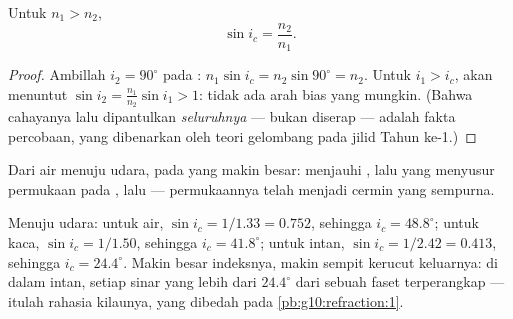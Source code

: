 \begin{proposition}\label{prop:g10:refraction:criticalformula}
Untuk $n_1 > n_2$,
\[
\sin i_c = \frac{n_2}{n_1} .
\]
\end{proposition}

\begin{proof}
Ambillah $i_2 = 90^\circ$ pada : $n_1 \sin i_c = n_2 \sin 90^\circ
= n_2$. Untuk $i_1 > i_c$,  akan menuntut
$\sin i_2 = \frac{n_1}{n_2}\sin i_1 > 1$: tidak ada arah bias yang
mungkin. (Bahwa cahayanya lalu dipantulkan \emph{seluruhnya} --- bukan
diserap --- adalah fakta percobaan, yang dibenarkan oleh teori gelombang
pada jilid Tahun ke-1.)
\end{proof}

\begin{omfigure}

{\small Dari air menuju udara, pada  yang makin besar:
 menjauhi , lalu  yang menyusur
permukaan pada , lalu  --- permukaannya
telah menjadi cermin yang sempurna.}
\end{omfigure}

\begin{example}\label{ex:g10:refraction:criticalvalues}
Menuju udara: untuk air, $\sin i_c = 1/1.33 = 0.752$, sehingga
$i_c = 48.8^\circ$; untuk kaca, $\sin i_c = 1/1.50$, sehingga
$i_c = 41.8^\circ$; untuk intan, $\sin i_c = 1/2.42 = 0.413$, sehingga
$i_c = 24.4^\circ$. Makin besar indeksnya, makin sempit kerucut
keluarnya: di dalam intan, setiap sinar yang lebih dari $24.4^\circ$
dari  sebuah faset terperangkap --- itulah rahasia
kilaunya, yang dibedah pada \cref{pb:g10:refraction:1}.
\end{example}

